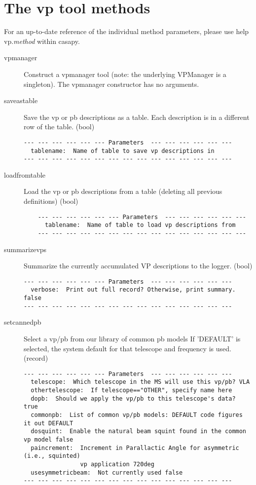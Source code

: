 \documentclass[12pt]{article}
\begin{document}
\section{The vp tool methods}
\label{secvptoolmethods}

For an up-to-date reference of the individual method parameters, please use help vp.{\it method}
within casapy. 
 
\begin{description}
\item[vpmanager]
   Construct a vpmanager tool (note: the underlying VPManager is a singleton).
   The vpmanager constructor has no arguments.
 
  \item[saveastable]
Save the vp or pb descriptions as a table.  Each description is in a different
row of the table. (bool)
{\small
\begin{verbatim}
--- --- --- --- --- --- Parameters  --- --- --- --- --- ---
  tablename:  Name of table to save vp descriptions in 
--- --- --- --- --- --- --- --- --- --- --- --- --- --- ---
\end{verbatim} 
}
 
\item[loadfromtable]
Load the vp or pb descriptions from a table (deleting all previous definitions) (bool)
{\small
\begin{verbatim}
    --- --- --- --- --- --- Parameters  --- --- --- --- --- ---
      tablename:  Name of table to load vp descriptions from 
    --- --- --- --- --- --- --- --- --- --- --- --- --- --- --- 
\end{verbatim} 
}


  \item[summarizevps]
Summarize the currently accumulated VP descriptions to the logger. (bool)
{\small
\begin{verbatim}
--- --- --- --- --- --- Parameters  --- --- --- --- --- ---
  verbose:  Print out full record? Otherwise, print summary. false 
--- --- --- --- --- --- --- --- --- --- --- --- --- --- ---
\end{verbatim} 
} 
 
  \item[setcannedpb]
   Select a vp/pb from our library of common pb models
   If 'DEFAULT' is selected, the system default for that telescope and frequency is used. (record)
{\small
\begin{verbatim}
--- --- --- --- --- --- Parameters  --- --- --- --- --- ---
  telescope:  Which telescope in the MS will use this vp/pb? VLA 
  othertelescope:  If telescope=="OTHER", specify name here 
  dopb:  Should we apply the vp/pb to this telescope's data? true 
  commonpb:  List of common vp/pb models: DEFAULT code figures it out DEFAULT 
  dosquint:  Enable the natural beam squint found in the common vp model false 
  paincrement:  Increment in Parallactic Angle for asymmetric (i.e., squinted) 
                vp application 720deg 
  usesymmetricbeam:  Not currently used false 
--- --- --- --- --- --- --- --- --- --- --- --- --- --- ---
\end{verbatim} 
} 


\end{description}
\end{document}
